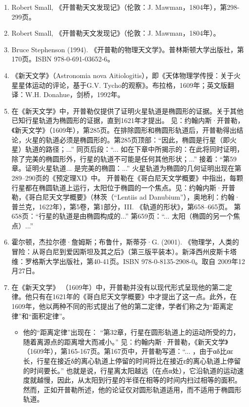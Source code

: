 \begin{enumerate}
\begin{itemize}
\end{itemize}
\item Robert Small, 《开普勒天文发现记》（伦敦：J. Mawman，1804年），第298-299页。  
\item Robert Small, 《开普勒天文发现记》（伦敦：J. Mawman，1804年）。  
\item Bruce Stephenson (1994). 《开普勒的物理天文学》。普林斯顿大学出版社，第170页。ISBN 978-0-691-03652-6。 
\item 《新天文学》（Astronomia nova Aitiologitis），即《天体物理学传授：关于火星星体运动的评论，基于G.V. Tycho的观察》。布拉格，1609年；英文版翻译：W.H. Donahue，剑桥，1992年。
\item 在《新天文学》中，开普勒仅提供了证明火星轨道是椭圆形的证据。关于其他已知行星轨道为椭圆形的证据，直到1621年才提出。  
见：约翰内斯·开普勒，《新天文学》（1609年），第285页。在排除圆形和椭圆形轨道后，开普勒得出结论，火星的轨道必须是椭圆形的。第285页顶部：“因此，椭圆是行星（即火星）轨道的路径；...” 同页后段：“... 如在下章中所揭示的：在此将同时证明，除了完美的椭圆形外，行星的轨道不可能是任何其他形状；...” 接着：“第59章。证明火星轨道... 是完美的椭圆：...” 火星轨道为椭圆的几何证明出现在第289–290页的《预定理XI》中。  
开普勒在《哥白尼天文学概要》中指出，每颗行星都在椭圆轨道上运行，太阳位于椭圆的一个焦点。见：约翰内斯·开普勒，《哥白尼天文学概要》（林茨（“Lentiis ad Danubium”），奥地利：约翰·普兰克，1622年），第5卷，第1部分，III. 《轨道的形状》，第658–665页。  
第658页：“行星的轨道是由椭圆构成的...”  
第659页：“... 太阳（椭圆的另一个焦点）...”  
\item 霍尔顿，杰拉尔德·詹姆斯；布鲁什，斯蒂芬·G. (2001). 《物理学，人类的冒险：从哥白尼到爱因斯坦及其之后》（第三版平装本）。新泽西州皮斯卡塔维：罗格斯大学出版社，第40-41页。ISBN 978-0-8135-2908-0。取自 2009年12月27日。
\item 在《新天文学》 （1609年）中，开普勒并没有以现代形式呈现他的第二定律。他只有在1621年的《哥白尼天文学概要》中才提出了这一点。此外，在1609年，他以两种不同的形式提出了他的第二定律，学者们称之为“距离定律”和“面积定律”。
\begin{itemize}
\item 他的“距离定律”出现在：  
“第32章，行星在圆形轨道上的运动所受的力，随着离源点的距离增大而减小。”  
见：约翰内斯·开普勒，《新天文学》（1609年），第165-167页。第167页中，开普勒写道：“... ，由于αδ比αε长，行星在接近δ的离心轨道上停留的时间将比在接近ε的离心轨道上停留的时间要长。”  
也就是说，行星离太阳越远（在点α处），它沿轨道的运动速度就越慢，因此，从太阳到行星的半径在相等的时间内扫过相等的面积。然而，正如开普勒所述，他的论证仅对圆形轨道适用，而不适用于椭圆形轨道。

\end{itemize}
\end{enumerate}

